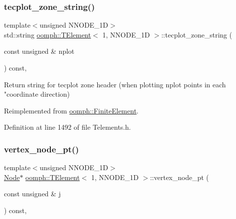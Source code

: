 \subsubsection{\texorpdfstring{tecplot\+\_\+zone\+\_\+string()}{tecplot\_zone\_string()}}
{\footnotesize\ttfamily template$<$unsigned N\+N\+O\+D\+E\+\_\+1D$>$ \\
std\+::string \hyperlink{classoomph_1_1TElement}{oomph\+::\+T\+Element}$<$ 1, N\+N\+O\+D\+E\+\_\+1D $>$\+::tecplot\+\_\+zone\+\_\+string (\begin{DoxyParamCaption}\item[{const unsigned \&}]{nplot }\end{DoxyParamCaption}) const\hspace{0.3cm}{\ttfamily [inline]}, {\ttfamily [virtual]}}



Return string for tecplot zone header (when plotting nplot points in each "coordinate direction) 



Reimplemented from \hyperlink{classoomph_1_1FiniteElement_a3193df31f9ce38e0609d17a8ffb386c6}{oomph\+::\+Finite\+Element}.



Definition at line 1492 of file Telements.\+h.

\mbox{\label{classoomph_1_1TElement_3_011_00_01NNODE__1D_01_4_af3470dfe32af9593a1a1dd19c2f282a3}} 
\subsubsection{\texorpdfstring{vertex\+\_\+node\+\_\+pt()}{vertex\_node\_pt()}}
{\footnotesize\ttfamily template$<$unsigned N\+N\+O\+D\+E\+\_\+1D$>$ \\
\hyperlink{classoomph_1_1Node}{Node}$\ast$ \hyperlink{classoomph_1_1TElement}{oomph\+::\+T\+Element}$<$ 1, N\+N\+O\+D\+E\+\_\+1D $>$\+::vertex\+\_\+node\+\_\+pt (\begin{DoxyParamCaption}\item[{const unsigned \&}]{j }\end{DoxyParamCaption}) const\hspace{0.3cm}{\ttfamily [inline]}, {\ttfamily [virtual]}}



